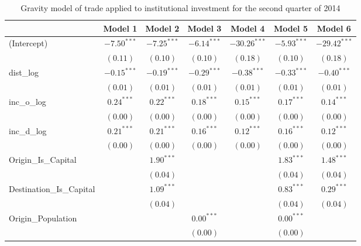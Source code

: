\begin{table}
	\small
	\begin{center}
		\caption[CGravity Model of Trade for Q2 2014]{Gravity model of trade applied to institutional investment for the second quarter of 2014}
		
		\begin{tabular}{l c c c c c c }
			\hline
			& Model 1 & Model 2 & Model 3 & Model 4 & Model 5 & Model 6 \\
			\hline
			(Intercept)                  & $-7.50^{***}$ & $-7.25^{***}$ & $-6.14^{***}$ & $-30.26^{***}$ & $-5.93^{***}$ & $-29.42^{***}$ \\
			& $(0.11)$      & $(0.10)$      & $(0.10)$      & $(0.18)$       & $(0.10)$      & $(0.18)$       \\
			dist\_log                    & $-0.15^{***}$ & $-0.19^{***}$ & $-0.29^{***}$ & $-0.38^{***}$  & $-0.33^{***}$ & $-0.40^{***}$  \\
			& $(0.01)$      & $(0.01)$      & $(0.01)$      & $(0.01)$       & $(0.01)$      & $(0.01)$       \\
			inc\_o\_log                  & $0.24^{***}$  & $0.22^{***}$  & $0.18^{***}$  & $0.15^{***}$   & $0.17^{***}$  & $0.14^{***}$   \\
			& $(0.00)$      & $(0.00)$      & $(0.00)$      & $(0.00)$       & $(0.00)$      & $(0.00)$       \\
			inc\_d\_log                  & $0.21^{***}$  & $0.21^{***}$  & $0.16^{***}$  & $0.12^{***}$   & $0.16^{***}$  & $0.12^{***}$   \\
			& $(0.00)$      & $(0.00)$      & $(0.00)$      & $(0.00)$       & $(0.00)$      & $(0.00)$       \\
			Origin\_Is\_Capital          &               & $1.90^{***}$  &               &                & $1.83^{***}$  & $1.48^{***}$   \\
			&               & $(0.04)$      &               &                & $(0.04)$      & $(0.04)$       \\
			Destination\_Is\_Capital     &               & $1.09^{***}$  &               &                & $0.83^{***}$  & $0.29^{***}$   \\
			&               & $(0.04)$      &               &                & $(0.04)$      & $(0.04)$       \\
			Origin\_Population           &               &               & $0.00^{***}$  &                & $0.00^{***}$  &                \\
			&               &               & $(0.00)$      &                & $(0.00)$      &                \\

\end{tabular}
\end{center}
\end{table}
